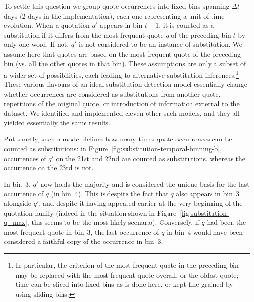 To settle this question we group quote occurrences into fixed bins spanning $\Delta t$ days (2 days in the implementation), each one representing a unit of time evolution.
When a quotation $q'$ appears in bin $t+1$, it is counted as a substitution if it differs from the most frequent quote $q$ of the preceding bin $t$ by only one word. If not, $q'$ is not considered to be an instance of substitution.  We assume here that quotes are based on the most frequent quote of the preceding bin (\hbox{vs.} all the other quotes in that bin).  These assumptions are only a subset of a wider set of possibilities, each leading to alternative substitution inferences.\footnote{In particular, the criterion of the most frequent quote in the preceding bin may be replaced with the most frequent quote overall, or the oldest quote; time can be sliced into fixed bins as is done here, or kept fine-grained by using sliding bins.}
These various flavours of an ideal substitution detection model essentially change whether occurrences are considered as substitutions from another quote, repetitions of the original quote, or introduction of information external to the dataset.
We identified and implemented eleven other such models, and they all yielded essentially the same results.

Put shortly, such a model defines how many times quote occurrences can be counted as substitutions: in Figure~\ref{fig:substitution-temporal-binning-b}, occurrences of $q'$ on the 21st and 22nd are counted as substitutions, whereas the occurrence on the 23rd is not.


In bin~3, $q'$ now holds the majority and is considered the unique basis for the last occurrence of $q$ (in bin~4). This is despite the fact that $q$ also appears in bin~3 alongside $q'$, and despite it having appeared earlier at the very beginning of the quotation family (indeed in the situation shown in Figure~\ref{fig:substitution-q_max}, this seems to be the most likely scenario). Conversely, if $q$ had been the most frequent quote in bin~3, the last occurrence of $q$ in bin~4 would have been considered a faithful copy of the occurrence in bin~3.

